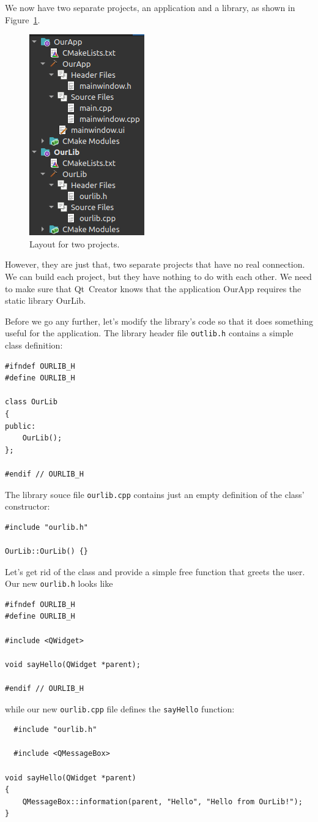 \documentclass[letterpaper]{article}
\begin{document}
  We now have two separate projects, an application and a library, as shown in Figure~\ref{fig:init_layout}.

  \begin{figure}[H]
    \centering
    \includegraphics{initial_project_layout.png}
    \caption{Layout for two projects.}
    \label{fig:init_layout}
  \end{figure}

  However, they are just that, two separate projects that have no real connection.
  We can build each project, but they have nothing to do with each other. We need
  to make sure that Qt~Creator knows that the application OurApp requires the static
  library OurLib.

  Before we go any further, let's modify the library's code so that it does something
  useful for the application. The library header file \verb|outlib.h| contains a
  simple class definition:
  \begin{lstlisting}
#ifndef OURLIB_H
#define OURLIB_H

class OurLib
{
public:
    OurLib();
};

#endif // OURLIB_H
  \end{lstlisting}
  The library souce file \verb|ourlib.cpp| contains just an empty definition of the class' constructor:
  \begin{lstlisting}
#include "ourlib.h"

OurLib::OurLib() {}
  \end{lstlisting}

  Let's get rid of the class and provide a simple free function that greets the user.
  Our new \verb|ourlib.h| looks like
\begin{lstlisting}
#ifndef OURLIB_H
#define OURLIB_H

#include <QWidget>

void sayHello(QWidget *parent);

#endif // OURLIB_H
  \end{lstlisting}
  while our new \verb|ourlib.cpp| file defines the \verb|sayHello| function:
  \begin{lstlisting}
  #include "ourlib.h"

  #include <QMessageBox>

void sayHello(QWidget *parent)
{
    QMessageBox::information(parent, "Hello", "Hello from OurLib!");
}
  \end{lstlisting}
\end{document}
